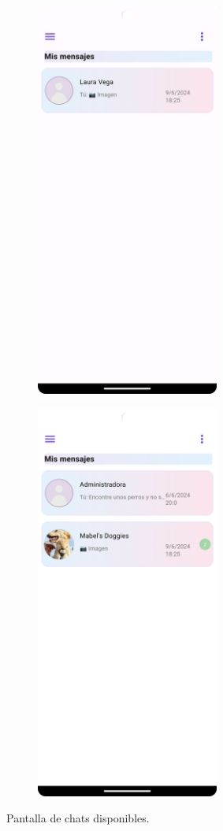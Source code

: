 \documentclass[a4paper, 12pt]{article}
\begin{document}
\begin{figure}[H]
   	\begin{subfigure}{0.48\textwidth}
		\begin{center}
			{\includegraphics[width=6cm]{app/ChatsPage.png}\par}
		\end{center}  
	\end{subfigure}\hfill
   	\begin{subfigure}{0.48\textwidth}
		\begin{center}
			{\includegraphics[width=6cm]{app/ChatsPageReceiver.png}\par}
		\end{center}  
	\end{subfigure}\hfill
	\caption{Pantalla de chats disponibles.}
\end{figure}
\end{document}
